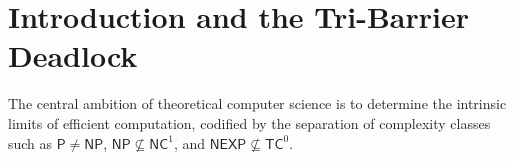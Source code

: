 \documentclass[11pt,a4paper]{article}
\theoremstyle{definition}
\theoremstyle{remark}
\newcommand{\NP}{\mathsf{NP}}
\newcommand{\PP}{\mathsf{P}}
\newcommand{\NEXP}{\mathsf{NEXP}}
\newcommand{\TC}{\mathsf{TC}}
\newcommand{\NC}{\mathsf{NC}}
\newcommand{\SparseTC}{\mathsf{SpectralSparse}\text{-}\mathsf{TC}^0}
\begin{document}
\begin{abstract}
\begin{enumerate}
    \[
    \NEXP \not\subseteq \SparseTC, \quad \NEXP \not\subseteq \TC^0[O(\log n)\text{-}\mathrm{IP}], \quad \text{and} \quad \NEXP \not\subseteq \TC^0
    \]
    \item \textbf{Non-Abelian Commutators \& Structural Frontier Barriers:} We analyze Barrington's non-solvable permutation branching program representation in the alternating group $A_5$. We prove that while formula trees experience an exact recursive word length explosion $L = 4^d$, read-many circuits with unbounded fan-out can reuse intermediate states across graph separators. We provide an exhaustive, unvarnished mathematical formulation of the \emph{Read-Many Fan-Out Gate Reuse Barrier} and the \emph{Majority Entanglement Barrier}.
\end{enumerate}
All derandomization algorithms, tensor contractions, and group commutator operations are implemented and verified on bare silicon in pure Zig 0.16.0 (\texttt{ReleaseFast}) with \textbf{zero dynamic heap allocations} ($\texttt{malloc}/\texttt{free} = 0$). Full source code is provided in Appendices~\ref{app:capp_kernel} and \ref{app:a5_kernel}.
\end{abstract}

\newpage
\tableofcontents
\newpage

\section{Introduction and the Tri-Barrier Deadlock}

The central ambition of theoretical computer science is to determine the intrinsic limits of efficient computation, codified by the separation of complexity classes such as $\PP \neq \NP$, $\NP \not\subseteq \NC^1$, and $\NEXP \not\subseteq \TC^0$.
\end{document}
